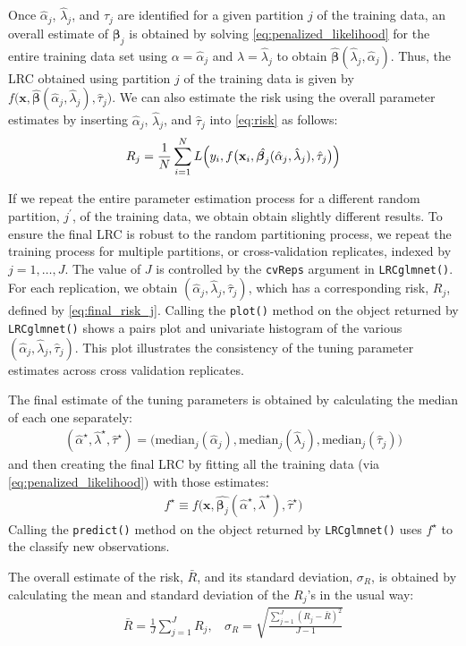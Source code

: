 \documentclass{article}
\begin{document}
Once $\hat\alpha_j$, $\hat\lambda_j$, and $\hat\tau_j$ are identified for a given partition $j$ of the training data, 
an overall estimate of $\boldsymbol\beta_j$ is obtained by
solving \eqref{eq:penalized_likelihood} for the entire training data set using $\alpha = \hat\alpha_j$ and 
$\lambda = \hat\lambda_j$ 
to obtain $\hat{\boldsymbol\beta}(\hat\lambda_j,\hat\alpha_j)$.  Thus, the LRC obtained using partition $j$ of the 
training data is given by $f \bigl( \mathbf{x},\hat{\boldsymbol{\beta}}(\hat\alpha_j,\hat\lambda_j),\hat\tau_j \bigr)$.  We can
also estimate the risk using the overall parameter estimates by inserting $\hat\alpha_j$, $\hat\lambda_j$, and $\hat\tau_j$ 
into
\eqref{eq:risk} as follows:
\begin{align}
\label{eq:final_risk_j}
R_j  = \frac{1}{N}\sum_{i=1}^N L \Bigl(y_i, f\bigl(\mathbf{x}_i,
\hat{\boldsymbol{\beta}_j}(\hat\alpha_j,\hat\lambda_j), \hat\tau_j \bigr) \Bigr)
\end{align}

If we repeat the entire parameter estimation process for a different random partition, $j^\prime$, of the training data, we
obtain obtain slightly different results.  To ensure the final LRC is robust to the random partitioning process, 
we repeat the training process for multiple partitions, or cross-validation replicates, indexed by $j = 1,\ldots,J$.  
The value of $J$ is controlled by the {\tt cvReps} argument in {\tt LRCglmnet()}.  For each replication, we obtain 
$(\hat\alpha_j, \hat\lambda_j, \hat\tau_j)$, which has a corresponding risk, $R_j$, defined by \eqref{eq:final_risk_j}.  
Calling the {\tt plot()} method
on the object returned by {\tt LRCglmnet()} shows a pairs plot and univariate histogram of the
various $(\hat\alpha_j, \hat\lambda_j, \hat\tau_j)$.  This plot illustrates the consistency of the tuning parameter estimates 
across cross validation replicates.

The final estimate of the tuning parameters is obtained by calculating the median of each one separately:
\begin{align}
(\hat\alpha^\star,\hat\lambda^\star,\hat\tau^\star) = \bigl(\text{median}_j(\hat\alpha_j), \text{median}_j(\hat\lambda_j),
  \text{median}_j(\hat\tau_j) \bigr)
\end{align}
\noindent and then creating the final LRC by fitting all the training data (via \eqref{eq:penalized_likelihood})
with those estimates: 
\begin{align}
f^\star \equiv f \bigl(\mathbf{x},\hat{\boldsymbol{\beta}_j}(\hat\alpha^\star,\hat\lambda^\star), \hat\tau^\star \bigr)
\end{align}
\noindent Calling the {\tt predict()} method on the object returned by {\tt LRCglmnet()} uses $f^\star$ to the classify
new observations.

The overall estimate of the risk, $\bar{R}$, and its standard deviation, $\sigma_R$, is obtained by calculating 
the mean and standard deviation of the $R_j$'s in the usual way:
\begin{align}
\bar{R} = \frac{1}{J}\sum_{j=1}^J R_j,  ~~~~ \sigma_R = \sqrt{\frac{\sum_{j=1}^J(R_j - \bar{R})^2}{J-1}}
\end{align}
\end{document}
